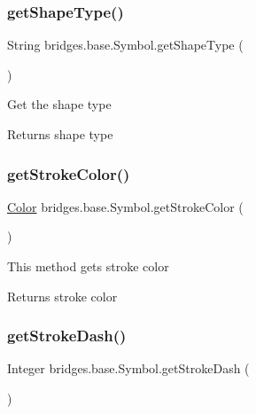 \subsubsection{\texorpdfstring{get\+Shape\+Type()}{getShapeType()}}
{\footnotesize\ttfamily String bridges.\+base.\+Symbol.\+get\+Shape\+Type (\begin{DoxyParamCaption}{ }\end{DoxyParamCaption})\hspace{0.3cm}{\ttfamily [protected]}}

Get the shape type

\begin{DoxyReturn}{Returns}
shape type 
\end{DoxyReturn}
\mbox{\label{classbridges_1_1base_1_1_symbol_abd38aaea2fc344adcc8096ed6eb8681c}} 
\subsubsection{\texorpdfstring{get\+Stroke\+Color()}{getStrokeColor()}}
{\footnotesize\ttfamily \hyperlink{classbridges_1_1base_1_1_color}{Color} bridges.\+base.\+Symbol.\+get\+Stroke\+Color (\begin{DoxyParamCaption}{ }\end{DoxyParamCaption})}

This method gets stroke color

\begin{DoxyReturn}{Returns}
stroke color 
\end{DoxyReturn}
\mbox{\label{classbridges_1_1base_1_1_symbol_a31ff460ae6b24ed968c1045e2533a967}} 
\subsubsection{\texorpdfstring{get\+Stroke\+Dash()}{getStrokeDash()}}
{\footnotesize\ttfamily Integer bridges.\+base.\+Symbol.\+get\+Stroke\+Dash (\begin{DoxyParamCaption}{ }\end{DoxyParamCaption})}

